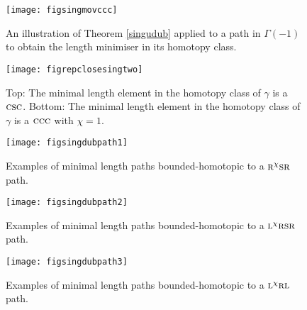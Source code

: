 \documentclass{amsart}
\theoremstyle{definition}
\theoremstyle{remark}
\numberwithin{equation}{section}
\begin{document}
{ \begin{figure} [[htbp]
 \begin{center}
\texttt{[image: figsingmovccc]}
\end{center}
\caption{An illustration of Theorem \ref{singudub} applied to a path in $\Gamma(-1)$ to obtain the length minimiser in its homotopy class.}
\label{figsingmovccc}
\end{figure}}

{ \begin{figure} [[htbp]
 \begin{center}
\texttt{[image: figrepclosesingtwo]}
\end{center}
\caption{Top: The minimal length element in the homotopy class of $\gamma$ is a $\mbox{\sc c}\mbox{\sc s}\mbox{\sc c}$. Bottom: The minimal length element in the homotopy class of $\gamma$ is a $\mbox{\sc c} \mbox{\sc c}\mbox{\sc c}$ with ${\chi}=1$.}
\label{figrepclosesingtwo}
\end{figure}}

{ \begin{figure} [[htbp]
 \begin{center}
\texttt{[image: figsingdubpath1]}
\end{center}
\caption{Examples of minimal length paths bounded-homotopic to a $\mbox{\sc r}^\chi \mbox{\sc s}\mbox{\sc r}$ path.}
\label{figsingdubpath1}
\end{figure}}

{ \begin{figure} [[htbp]
 \begin{center}
\texttt{[image: figsingdubpath2]}
\end{center}
\caption{Examples of minimal length paths bounded-homotopic to a $\mbox{\sc l}^{\chi}\mbox{\sc r}\mbox{\sc s}\mbox{\sc r}$ path.}
\label{figsingdubpath2}
\end{figure}}

{ \begin{figure} [[htbp]
 \begin{center}
\texttt{[image: figsingdubpath3]}
\end{center}
\caption{Examples of minimal length paths bounded-homotopic to a $\mbox{\sc l}^\chi \mbox{\sc r}\mbox{\sc l}$ path.}
\label{figsingdubpath3}
\end{figure}}
\end{document}
